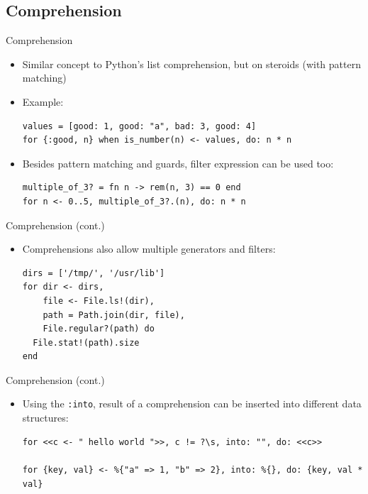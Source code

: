 \documentclass[12pt]{beamer}
\begin{document}
\subsection{Comprehension}
\begin{frame}[fragile]{Comprehension}
  \begin{itemize}
    \item Similar concept to Python's list comprehension, but on steroids (with pattern matching)
    \item Example:
          \begin{verbatim}
values = [good: 1, good: "a", bad: 3, good: 4]
for {:good, n} when is_number(n) <- values, do: n * n
  \end{verbatim}
    \item Besides pattern matching and guards, filter expression can be used too:
          \begin{verbatim}
multiple_of_3? = fn n -> rem(n, 3) == 0 end
for n <- 0..5, multiple_of_3?.(n), do: n * n
  \end{verbatim}
  \end{itemize}
\end{frame}

\begin{frame}[fragile]{Comprehension (cont.)}
  \begin{itemize}
    \item Comprehensions also allow multiple generators and filters:
          \begin{verbatim}
dirs = ['/tmp/', '/usr/lib']
for dir <- dirs,
    file <- File.ls!(dir),
    path = Path.join(dir, file),
    File.regular?(path) do
  File.stat!(path).size
end
  \end{verbatim}
  \end{itemize}
\end{frame}

\begin{frame}[fragile]{Comprehension (cont.)}
  \begin{itemize}
    \item Using the \texttt{:into}, result of a comprehension can be inserted into different data structures:
          \begin{verbatim}
for <<c <- " hello world ">>, c != ?\s, into: "", do: <<c>>

for {key, val} <- %{"a" => 1, "b" => 2}, into: %{}, do: {key, val * val}
  \end{verbatim}
  \end{itemize}
\end{frame}
\end{document}
